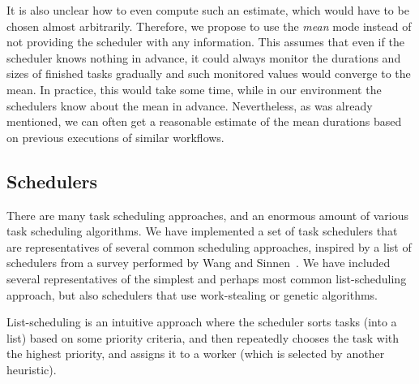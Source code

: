 \begin{description}
		It is also unclear how to even compute such an estimate, which would have to be chosen almost
		arbitrarily. Therefore, we propose to use the \emph{mean} mode instead of not providing
		the scheduler with any information. This assumes that even if the scheduler knows nothing in
		advance, it could always monitor the durations and sizes of finished tasks gradually and such
		monitored values would converge to the mean. In practice, this would take some time, while in our
		environment the schedulers know about the mean in advance. Nevertheless, as was already mentioned,
		we can often get a reasonable estimate of the mean durations based on previous executions of
		similar workflows.
\end{description}

%

\subsection{Schedulers}
There are many task scheduling approaches, and an enormous amount of various task scheduling
algorithms. We have implemented a set of task schedulers that are representatives of several common
scheduling approaches, inspired by a list of schedulers from a survey performed by Wang and
Sinnen~\cite{wang2018list}. We have included several representatives of the simplest and perhaps
most common list-scheduling approach, but also schedulers that use work-stealing or genetic
algorithms.

List-scheduling is an intuitive approach where the scheduler sorts tasks (into a list) based on
some priority criteria, and then repeatedly chooses the task with the highest priority, and assigns
it to a worker (which is selected by another heuristic).

